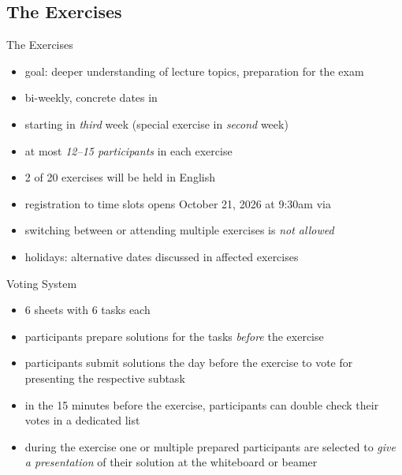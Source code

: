 \subsection{The Exercises}
\begin{frame}{\insertsubsection}
	\begin{fancycolumns}[widths={45}]
		\begin{definition}{The Exercises}
			\begin{itemize}
				\item goal: deeper understanding of lecture topics, preparation for the exam
				\item bi-weekly, concrete dates in \StudIPExercise
				\item starting in \emph{third} week (special exercise in \emph{second} week)
				\item at most \emph{12--15 participants} in each exercise
				\item 2 of 20 exercises will be held in English
				\item registration to time slots opens October 21, 2026 at 9:30am via \StudIPExercise
				\item switching between or attending multiple exercises is \emph{not allowed}
				\item holidays: alternative dates discussed in affected exercises
			\end{itemize}
		\end{definition}
		\nextcolumn
		\begin{definition}{Voting System }
			\begin{itemize}
				\item 6 sheets with 6 tasks each
				\item participants prepare solutions for the tasks \emph{before} the exercise
				\item participants submit solutions the day before the exercise to vote  for presenting the respective subtask
				\item in the 15 minutes before the exercise, participants can double check their votes  in a dedicated list 
				\item during the exercise one or multiple prepared participants are selected to \emph{give a presentation} of their solution at the whiteboard or beamer

\end{itemize}
\end{definition}
\end{fancycolumns}
\end{frame}
